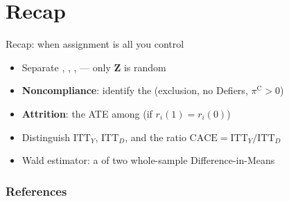 \documentclass[table, xcolor = {dvipsnames}, 9pt]{beamer}
\theoremstyle{plain}
\newcommand{\mh}[1]{{\color{magenta}{#1}}}
\newcommand{\ITTY}{\mathrm{ITT}_Y}
\newcommand{\ITTD}{\mathrm{ITT}_D}
\newcommand{\CACE}{\mathrm{CACE}}
\begin{document}
\section{Recap}

\begin{frame}[t]{Recap: when assignment is all you control}
\vfill
\begin{itemize} \vfill
\item Separate \mh{assignment}, \mh{receipt}, \mh{reporting}, \mh{outcome} --- only $\bm{Z}$ is random \vfill
\item \textbf{Noncompliance}: identify the \mh{CACE} (exclusion, no Defiers, $\pi^{\textrm{C}} > 0$) \vfill
\item \textbf{Attrition}: the ATE among \mh{Always-Reporters} (if $r_i(1) = r_i(0)$) \vfill
\item Distinguish $\ITTY$, $\ITTD$, and the ratio $\CACE = \ITTY/\ITTD$ \vfill
\item Wald estimator: a \mh{ratio} of two whole-sample Difference-in-Means \vfill
\end{itemize} \vfill
\end{frame}
\begin{frame}[allowframebreaks]
\frametitle{References}
\scriptsize


\end{frame}
\end{document}
